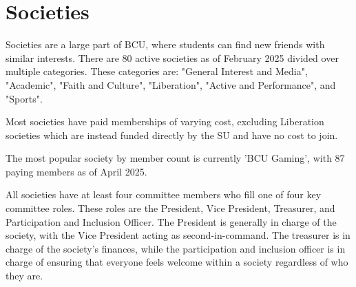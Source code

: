 \documentclass{article}
\begin{document}
\section{Societies}
Societies are a large part of BCU, where students can find new friends with similar interests. There are 80 active societies as of 
February 2025 divided over multiple categories. These categories are: "General Interest and Media", "Academic", "Faith and Culture", "Liberation", 
"Active and Performance", and "Sports". 

Most societies have paid memberships of varying cost, excluding Liberation societies which are instead funded directly by the SU and have no 
cost to join.

The most popular society by member count is currently 'BCU Gaming', with 87 paying members as of April 2025.

All societies have at least four committee members who fill one of four key committee roles. These roles are the President, Vice President, 
Treasurer, and Participation and Inclusion Officer. The President is generally in charge of the society, with the Vice President acting as 
second-in-command. The treasurer is in charge of the society's finances, while the participation and inclusion officer is in charge of ensuring that 
everyone feels welcome within a society regardless of who they are.
\end{document}
